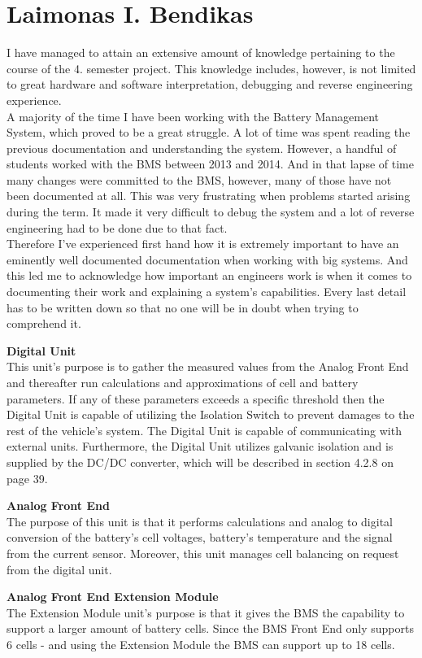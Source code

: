 \section{Laimonas I. Bendikas}
I have managed to attain an extensive amount of knowledge pertaining to the course of the 4. semester project. This knowledge includes, however, is not limited to great hardware and software interpretation, debugging and reverse engineering experience.\\
A majority of the time I have been working with the Battery Management System, which proved to be a great struggle. A lot of time was spent reading the previous documentation and understanding the system. However, a handful of students worked with the BMS between 2013 and 2014. And in that lapse of time many changes were committed to the BMS, however, many of those have not been documented at all. This was very frustrating when problems started arising during the term. It made it very difficult to debug the system and a lot of reverse engineering had to be done due to that fact.\\
Therefore I've experienced first hand how it is extremely important to have an eminently well documented documentation when working with big systems. And this led me to acknowledge how important an engineers work is when it comes to documenting their work and explaining a system's capabilities. Every last detail has to be written down so that no one will be in doubt when trying to comprehend it. 

\textbf{Digital Unit}\\
This unit's purpose is to gather the measured values from the Analog Front End and thereafter run calculations and approximations of cell and battery parameters. If any of these parameters exceeds a specific threshold then the Digital Unit is capable of utilizing the Isolation Switch to prevent damages to the rest of the vehicle's system. The Digital Unit is capable of communicating with external units. Furthermore, the Digital Unit utilizes galvanic isolation and is supplied by the DC/DC converter, which will be described in section 4.2.8 on page 39.

\textbf{Analog Front End}\\
The purpose of this unit is that it performs calculations and analog to digital conversion of the battery's cell voltages, battery's temperature and the signal from the current sensor. Moreover, this unit manages cell balancing on request from the digital unit. 

\textbf{Analog Front End Extension Module}\\
The Extension Module unit's purpose is that it gives the BMS the capability to support a
larger amount of battery cells. Since the BMS Front End only supports 6 cells - and using
the Extension Module the BMS can support up to 18 cells. 

